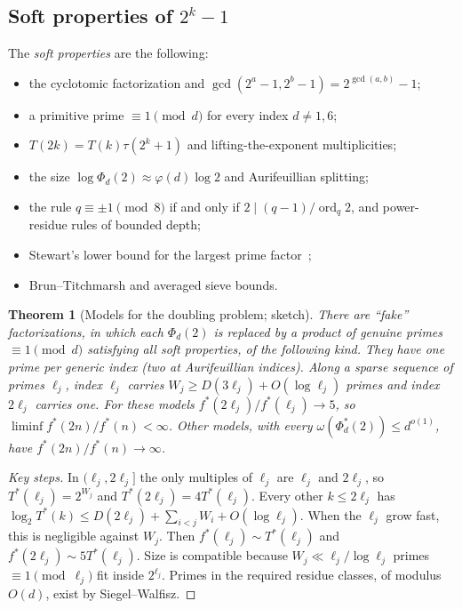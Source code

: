 \documentclass[11pt]{amsart}
\newtheorem{theorem}{Theorem}[section]
\theoremstyle{definition}
\theoremstyle{remark}
\newcommand{\ord}{\operatorname{ord}}
\begin{document}
\subsection{Soft properties of \texorpdfstring{$2^k-1$}{2\textasciicircum k-1}}\label{sec:barrier-doubling}
The \emph{soft properties} are the following:
\begin{itemize}
\item the cyclotomic factorization and $\gcd(2^a-1,2^b-1)=2^{\gcd(a,b)}-1$;
\item a primitive prime $\equiv1\pmod d$ for every index $d\ne1,6$;
\item $T(2k)=T(k)\tau(2^k+1)$ and lifting-the-exponent multiplicities;
\item the size $\log\Phi_d(2)\approx\varphi(d)\log 2$ and Aurifeuillian splitting;
\item the rule $q\equiv\pm1\pmod8$ if and only if $2\mid(q-1)/\ord_q2$, and power-residue rules of bounded depth;
\item Stewart's lower bound for the largest prime factor~\cite{St13};
\item Brun--Titchmarsh and averaged sieve bounds.
\end{itemize}

\begin{theorem}[Models for the doubling problem; sketch]\label{thm:model-doubling}
There are ``fake'' factorizations, in which each $\Phi_d(2)$ is replaced by a product of genuine primes
$\equiv1\pmod d$ satisfying all soft properties, of the following kind. They have one prime per generic index (two at
Aurifeuillian indices). Along a sparse sequence of primes $\ell_j$, index $\ell_j$ carries
$W_j\ge D(3\ell_j)+O(\log\ell_j)$ primes and index $2\ell_j$ carries one. For these models
$f^*(2\ell_j)/f^*(\ell_j)\to5$, so $\liminf f^*(2n)/f^*(n)<\infty$. Other models, with every
$\omega(\Phi_d^*(2))\le d^{o(1)}$, have $f^*(2n)/f^*(n)\to\infty$.
\end{theorem}
\begin{proof}[Key steps]
In $(\ell_j,2\ell_j]$ the only multiples of $\ell_j$ are $\ell_j$ and $2\ell_j$, so
$T^*(\ell_j)=2^{W_j}$ and $T^*(2\ell_j)=4T^*(\ell_j)$. Every other $k\le2\ell_j$ has
$\log_2T^*(k)\le D(2\ell_j)+\sum_{i<j}W_i+O(\log \ell_j)$. When the $\ell_j$ grow fast, this is negligible against $W_j$.
Then $f^*(\ell_j)\sim T^*(\ell_j)$ and $f^*(2\ell_j)\sim5T^*(\ell_j)$. Size is compatible because
$W_j\ll\ell_j/\log\ell_j$ primes $\equiv1\pmod{\ell_j}$ fit inside $2^{\ell_j}$. Primes in the required residue
classes, of modulus $O(d)$, exist by Siegel--Walfisz.
\end{proof}
\end{document}
